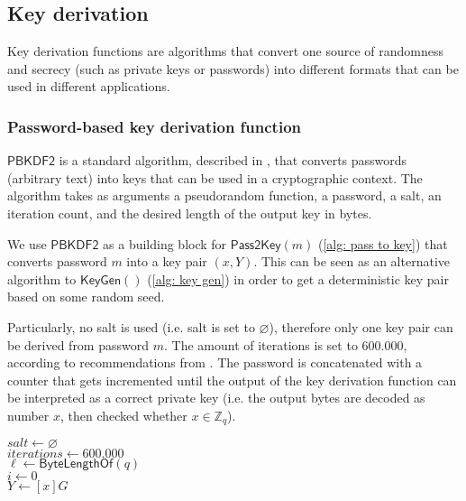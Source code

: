 \clearpage
\subsection{Key derivation} \label{app: key derivation}
Key derivation functions are algorithms that convert one source of randomness and secrecy (such as private keys or passwords) into different formats that can be used in different applications.


\subsubsection{Password-based key derivation function} \label{app: password-based key derivation function}
$\mathsf{PBKDF2}$ is a standard algorithm, described in \cite{RFC8018}, that converts passwords (arbitrary text) into keys that can be used in a cryptographic context. The algorithm takes as arguments a pseudorandom function, a password, a salt, an iteration count, and the desired length of the output key in bytes.

We use $\mathsf{PBKDF2}$ as a building block for $\mathsf{Pass2Key}(m)$ (\cref{alg: pass to key}) that converts password $m$ into a key pair $(x, Y)$. This can be seen as an alternative algorithm to $\mathsf{KeyGen}()$ (\cref{alg: key gen}) in order to get a deterministic key pair based on some random seed.

Particularly, no salt is used (i.e. salt is set to $\varnothing$), therefore only one key pair can be derived from password $m$. The amount of iterations is set to 600.000, according to recommendations from \cite{OWASP}. The password is concatenated with a counter that gets incremented until the output of the key derivation function can be interpreted as a correct private key (i.e. the output bytes are decoded as number $x$, then checked whether $x \in \mathbb{Z}_q$).

\begin{algorithm}[ht]
    \DontPrintSemicolon
    \caption{$\mathsf{Pass2Key}(m)$}
    \label{alg: pass to key}
    
    $salt \gets \varnothing$ \\
    $iterations \gets 600.000$ \\
    $\ell \gets \mathsf{ByteLengthOf}(q)$ \\
    $i \gets 0$ \\
    $Y \gets [x]G$ \\
     
\end{algorithm}


